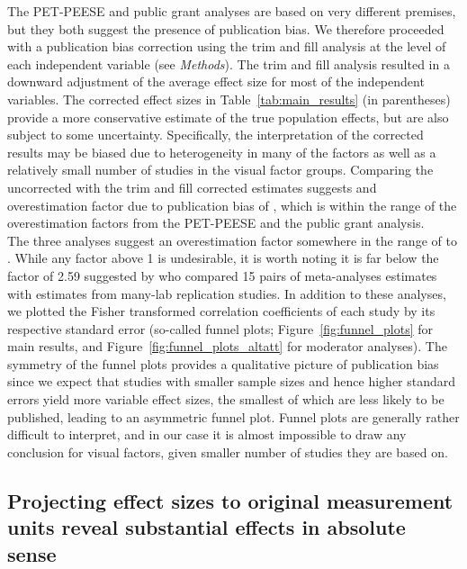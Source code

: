 The PET-PEESE and public grant analyses are based on very different premises, but they both suggest the presence of publication bias. We therefore proceeded with a publication bias correction using the trim and fill analysis \citep{duval2000trim} at the level of each independent variable (see \textit{Methods}). The trim and fill analysis resulted in a downward adjustment of the average effect size for most of the independent variables. The corrected effect sizes in Table~\ref{tab:main_results} (in parentheses) provide a more conservative estimate of the true population effects, but are also subject to some uncertainty. Specifically, the interpretation of the corrected results may be biased due to heterogeneity in many of the factors as well as a relatively small number of studies in the visual factor groups. Comparing the uncorrected with the trim and fill corrected estimates suggests and overestimation factor due to publication bias of , which is within the range of the overestimation factors from the PET-PEESE and the public grant analysis. \\

The three analyses suggest an overestimation factor somewhere in the range of  to \unskip. While any factor above 1 is undesirable, it is worth noting it is far below the factor of 2.59 suggested by \cite{kvarven2020} who compared 15 pairs of meta-analyses estimates with estimates from many-lab replication studies. In addition to these analyses, we plotted the Fisher transformed correlation coefficients of each study by its respective standard error (so-called funnel plots; Figure~\ref{fig:funnel_plots} for main results, and Figure~\ref{fig:funnel_plots_altatt} for moderator analyses). The symmetry of the funnel plots provides a qualitative picture of publication bias since we expect that studies with smaller sample sizes and hence higher standard errors yield more variable effect sizes, the smallest of which are less likely to be published, leading to an asymmetric funnel plot. Funnel plots are generally rather difficult to interpret, and in our case it is almost impossible to draw any conclusion for visual factors, given smaller number of studies they are based on.




\subsection{Projecting effect sizes to original measurement units reveal substantial effects in absolute sense}


